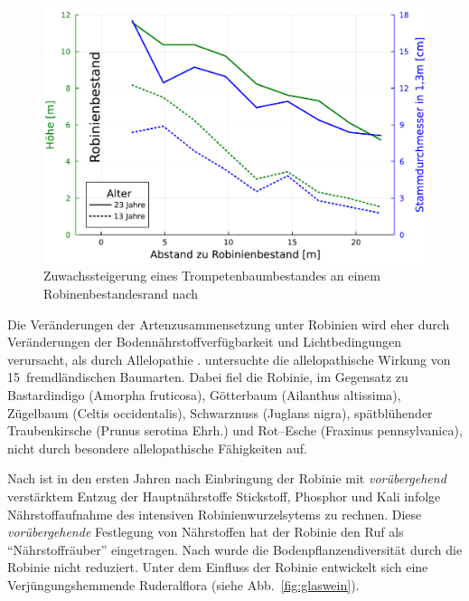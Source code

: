 \documentclass[twocolumn]{scrartcl}
\begin{document}
\begin{figure}[htbp]
  \centering
  \includegraphics[width=.9\linewidth]{./bild/bestandesrand}
  \caption{Zuwachssteigerung eines Trompetenbaumbestandes an einem
    Robinenbestandesrand nach
    \citet{ferguson1922robinie,chapman1935robinie}}
  \label{fig:bestandesrand}
\end{figure}

Die Veränderungen der Artenzusammensetzung unter Robinien wird eher
durch Veränderungen der Bodennährstoffverfügbarkeit und
Lichtbedingungen verursacht, als durch Allelopathie
\citep{vitkova2017robinie}.  \citet{csiszar2009allelopathy}
untersuchte die allelopathische Wirkung von 15~fremdländischen
Baumarten. Dabei fiel die Robinie, im Gegensatz zu Bastardindigo
(Amorpha fruticosa), Götterbaum (Ailanthus altissima), Zügelbaum
(Celtis occidentalis), Schwarznuss (Juglans nigra), spätblühender
Traubenkirsche (Prunus serotina Ehrh.) und Rot--Esche (Fraxinus
pennsylvanica), nicht durch besondere allelopathische Fähigkeiten auf.

Nach \citet{mueller1991robinie} ist in den
ersten Jahren nach Einbringung der Robinie mit \emph{vorübergehend}
verstärktem Entzug der Hauptnährstoffe Stickstoff, Phosphor und Kali
infolge Nährstoffaufnahme des intensiven Robinienwurzelsytems zu
rechnen. Diese \emph{vorübergehende} Festlegung von Nährstoffen hat
der Robinie den Ruf als \enquote{Nährstoffräuber} eingetragen. Nach
\citet{sitzia2012robinie} wurde die Bodenpflanzendiversität durch die
Robinie nicht reduziert. Unter dem Einfluss der Robinie entwickelt
sich eine Verjüngungshemmende Ruderalflora (siehe
Abb.~\ref{fig:glaswein}).
\end{document}
